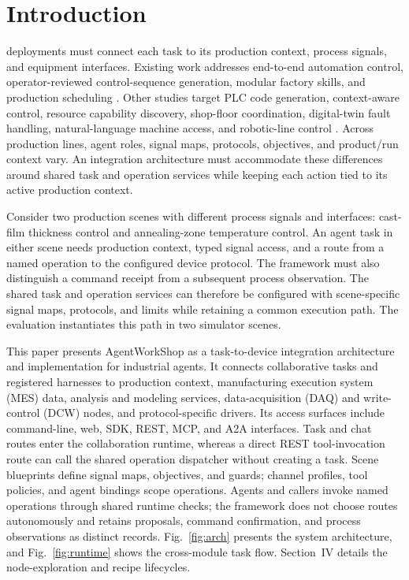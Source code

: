 \section{Introduction}
 deployments must connect each task to its
production context, process signals, and equipment interfaces. Existing work
addresses end-to-end automation control, operator-reviewed control-sequence
generation, modular factory skills, and production scheduling
\cite{xia2025control,huang2026made,koehle2026llmdriven,waseem2026pretrained}.
Other studies target PLC code generation, context-aware control, resource
capability discovery, shop-floor coordination, digital-twin fault handling,
natural-language machine access, and robotic-line control
\cite{liu2026agents4plc,wu2025instructmpc,lim2025llmenabled,zhao2026shopfloor,gill2025llmdt,hofmann2025nlc}.
Across production lines, agent roles, signal maps, protocols, objectives, and
product/run context vary. An integration architecture must accommodate these
differences around shared task and operation services while keeping each
action tied to its active production context.

Consider two production scenes with different process signals and interfaces:
cast-film thickness control and annealing-zone temperature control. An agent
task in either scene needs production context, typed signal access, and a
route from a named operation to the configured device protocol. The framework
must also distinguish a command receipt from a subsequent process
observation. The shared task and operation services can therefore be
configured with scene-specific signal maps, protocols, and limits while
  retaining a common execution path. The evaluation instantiates this path in
  two simulator scenes.

This paper presents AgentWorkShop as a task-to-device integration architecture
and implementation for industrial agents. It connects collaborative tasks
and registered harnesses to production context, manufacturing execution
system (MES) data, analysis and modeling services, data-acquisition (DAQ) and
write-control (DCW) nodes, and protocol-specific drivers. Its access surfaces include command-line, web,
SDK, REST, MCP, and A2A interfaces. Task and chat routes enter the
collaboration runtime, whereas a direct REST tool-invocation route can call
the shared operation dispatcher without creating a task.
Scene blueprints define signal maps, objectives, and guards; channel profiles,
tool policies, and agent bindings scope operations. Agents and callers invoke
named operations through shared runtime checks; the framework does not choose
routes autonomously and retains proposals, command confirmation, and process
observations as distinct records. Fig.~\ref{fig:arch} presents the system
architecture, and Fig.~\ref{fig:runtime} shows the cross-module task flow.
Section~IV details the node-exploration and recipe lifecycles.

